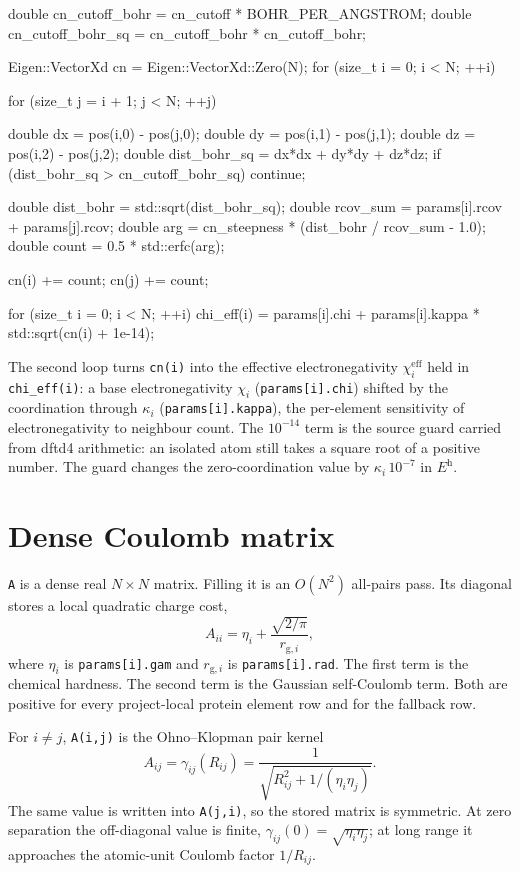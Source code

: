 \documentclass[11pt]{article}
\newcommand{\code}[1]{\texttt{#1}}
\begin{document}
\begin{codebox}
double cn_cutoff_bohr = cn_cutoff * BOHR_PER_ANGSTROM;
double cn_cutoff_bohr_sq = cn_cutoff_bohr * cn_cutoff_bohr;

Eigen::VectorXd cn = Eigen::VectorXd::Zero(N);
for (size_t i = 0; i < N; ++i) {
    for (size_t j = i + 1; j < N; ++j) {
        double dx = pos(i,0) - pos(j,0);
        double dy = pos(i,1) - pos(j,1);
        double dz = pos(i,2) - pos(j,2);
        double dist_bohr_sq = dx*dx + dy*dy + dz*dz;
        if (dist_bohr_sq > cn_cutoff_bohr_sq) continue;

        double dist_bohr = std::sqrt(dist_bohr_sq);
        double rcov_sum = params[i].rcov + params[j].rcov;
        double arg = cn_steepness * (dist_bohr / rcov_sum - 1.0);
        double count = 0.5 * std::erfc(arg);

        cn(i) += count;
        cn(j) += count;
    }
}

for (size_t i = 0; i < N; ++i)
    chi_eff(i) = params[i].chi
               + params[i].kappa * std::sqrt(cn(i) + 1e-14);
\end{codebox}

The second loop turns \code{cn(i)} into the effective electronegativity
\(\chi_i^{\mathrm{eff}}\) held in \code{chi\_eff(i)}: a base electronegativity
\(\chi_i\) (\code{params[i].chi}) shifted by the coordination through
\(\kappa_i\) (\code{params[i].kappa}), the per-element sensitivity of
electronegativity to neighbour count. The \(10^{-14}\) term is the source guard
carried from dftd4 arithmetic: an isolated atom still takes a square root of a
positive number. The guard changes the zero-coordination value by
\(\kappa_i\,10^{-7}\) in \(\si{\hartree}\).

\section{Dense Coulomb matrix}

\code{A} is a dense real \(N\times N\) matrix. Filling it is an \(O(N^2)\)
all-pairs pass. Its diagonal stores a local
quadratic charge cost,
\[
  A_{ii} = \eta_i + \frac{\sqrt{2/\pi}}{r_{\mathrm g,i}},
\]
where \(\eta_i\) is \code{params[i].gam} and \(r_{\mathrm g,i}\) is
\code{params[i].rad}. The first term is the chemical hardness. The second term
is the Gaussian self-Coulomb term. Both are positive for every project-local
protein element row and for the fallback row.

For \(i\ne j\), \code{A(i,j)} is the Ohno--Klopman pair kernel
\[
  A_{ij} =
  \gamma_{ij}(R_{ij}) =
  \frac{1}{\sqrt{R_{ij}^2+1/(\eta_i\eta_j)}} .
\]
The same value is written into \code{A(j,i)}, so the stored matrix is symmetric.
At zero separation the off-diagonal value is finite,
\(\gamma_{ij}(0)=\sqrt{\eta_i\eta_j}\); at long range it approaches the
atomic-unit Coulomb factor \(1/R_{ij}\).
\end{document}
